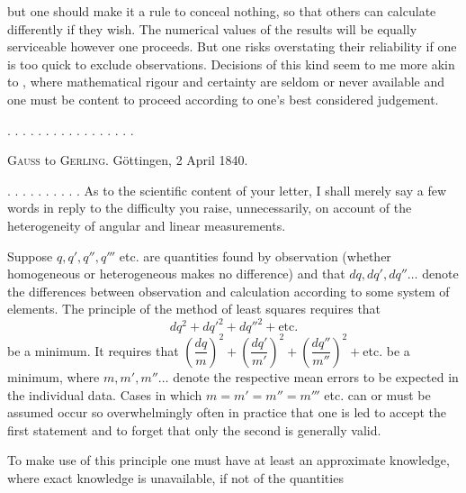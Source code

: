 but one should make it a rule to conceal nothing, so that others can calculate differently if they wish. The numerical values of the results will be equally serviceable however one proceeds. But one risks overstating their reliability if one is too quick to exclude observations. Decisions of this kind seem to me more akin to , where mathematical rigour and certainty are seldom or never available and one must be content to proceed according to one's best considered judgement.

\begin{center}
. . . . . . . . . . . . . . . . .
\end{center}



\begin{center}
\textsc{Gauss} to \textsc{Gerling}. Göttingen, 2 April 1840.
\end{center}

. . . . . . . . . . As to the scientific content of your letter, I shall merely say a few words in reply to the difficulty you raise, unnecessarily, on account of the heterogeneity of angular and linear measurements.

Suppose $q, q', q'', q'''$ etc. are quantities found by observation (whether homogeneous or heterogeneous makes no difference) and that $dq, dq', dq''\ldots$ denote the differences between observation and calculation according to some system of elements. The principle of the method of least squares  requires that
\[
dq^2+dq'^2+dq''^2+\text{etc.}
\]
be a minimum. It requires that
$\left(\dfrac{dq}{m}\right)^2+\left(\dfrac{dq'}{m'}\right)^2+\left(\dfrac{dq''}{m''}\right)^2+$etc.
be a minimum, where $m, m', m''\ldots$ denote the respective mean errors to be expected in the individual data. Cases in which $m=m'=m''=m'''$ etc. can or must be assumed occur so overwhelmingly often in practice that one is led to accept the first statement and to forget that only the second is generally valid.

To make use of this principle one must have at least an approximate knowledge, where exact knowledge is unavailable, if not of the quantities
